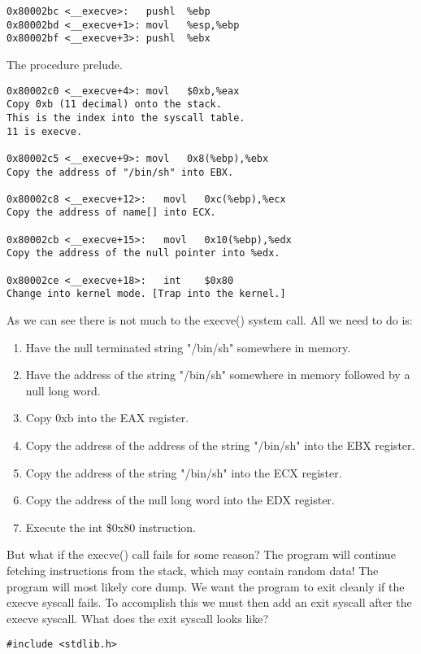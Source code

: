 \documentclass[10pt]{article}
\begin{document}
\begin{CJK}{UTF8}{bsmi}
\begin{verbatim}
0x80002bc <__execve>:   pushl  %ebp
0x80002bd <__execve+1>: movl   %esp,%ebp
0x80002bf <__execve+3>: pushl  %ebx
\end{verbatim}
The procedure prelude. 
\begin{verbatim}
0x80002c0 <__execve+4>: movl   $0xb,%eax
Copy 0xb (11 decimal) onto the stack. 
This is the index into the syscall table. 
11 is execve. 

0x80002c5 <__execve+9>: movl   0x8(%ebp),%ebx
Copy the address of "/bin/sh" into EBX. 

0x80002c8 <__execve+12>:   movl   0xc(%ebp),%ecx
Copy the address of name[] into ECX. 

0x80002cb <__execve+15>:   movl   0x10(%ebp),%edx
Copy the address of the null pointer into %edx. 

0x80002ce <__execve+18>:   int    $0x80
Change into kernel mode. [Trap into the kernel.] 
\end{verbatim}
As we can see there is not much to the execve() system call. All we need to do is: 
\begin{enumerate}
\item Have the null terminated string "/bin/sh" somewhere in memory. 
\item Have the address of the string "/bin/sh" somewhere in memory followed by a null long word. 
\item Copy 0xb into the EAX register. 
\item Copy the address of the address of the string "/bin/sh" into the EBX register. 
\item Copy the address of the string "/bin/sh" into the ECX register. 
\item Copy the address of the null long word into the EDX register. 
\item Execute the int \$0x80 instruction. 
\end{enumerate}


But what if the execve() call fails for some reason? The program will continue fetching instructions from the 
stack, which may contain random data! The program will most likely core dump. We want the program to exit 
cleanly if the execve syscall fails. To accomplish this we must then add an exit syscall after the execve syscall. 
What does  the exit syscall looks like?


\begin{lstlisting}[caption=exit.c]
#include <stdlib.h>


\end{lstlisting}
\end{CJK}
\end{document}
